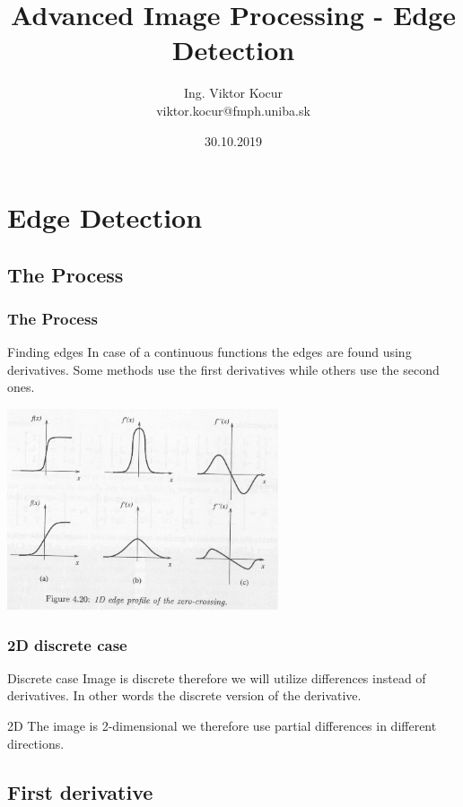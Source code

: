 \documentclass{beamer}
\title[6. cvičenie]{Advanced Image Processing - Edge Detection}
\author[Kocur]{Ing. Viktor Kocur \\{\small viktor.kocur@fmph.uniba.sk}}
\institute{DAI FMFI UK}
\date{30.10.2019}
\begin{document}

\begin{frame}
  \titlepage
\end{frame}

\section{Edge Detection}
\subsection{The Process}

\begin{frame}
\frametitle{The Process}
  \begin{block}{Finding edges}
  In case of a continuous functions the edges are found using derivatives. Some methods use the first derivatives while others use the second ones.
  \end{block}

  \begin{center}
  \includegraphics[width=0.6\textwidth]{zero-crossing.png}
  \end{center}
\end{frame}

\begin{frame}
\frametitle{2D discrete case}
  \begin{block}{Discrete case}
  Image is discrete therefore we will utilize differences instead of derivatives. In other words the discrete version of the derivative.
  \end{block}

  \begin{block}{2D}
  The image is 2-dimensional we therefore use partial differences in different directions.
  \end{block}
\end{frame}

\subsection{First derivative}
\end{document}
